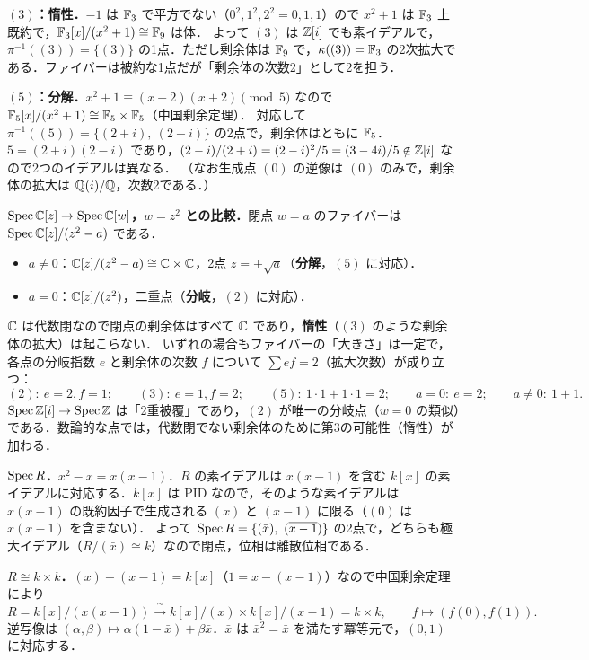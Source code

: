 \textbf{$(3)$：惰性．}$-1$ は $\mathbb{F}_3$ で平方でない（$0^2,1^2,2^2=0,1,1$）ので $x^2+1$ は $\mathbb{F}_3$ 上既約で，$\mathbb{F}_3[x]/(x^2+1)\cong\mathbb{F}_9$ は体．
よって $(3)$ は $\mathbb{Z}[i]$ でも素イデアルで，$\pi^{-1}((3))=\{(3)\}$ の1点．ただし剰余体は $\mathbb{F}_9$ で，$\kappa((3))=\mathbb{F}_3$ の2次拡大である．ファイバーは被約な1点だが「剰余体の次数2」として2を担う．

\textbf{$(5)$：分解．}$x^2+1\equiv(x-2)(x+2)\pmod 5$ なので $\mathbb{F}_5[x]/(x^2+1)\cong\mathbb{F}_5\times\mathbb{F}_5$（中国剰余定理）．
対応して $\pi^{-1}((5))=\{(2+i),\ (2-i)\}$ の2点で，剰余体はともに $\mathbb{F}_5$．$5=(2+i)(2-i)$ であり，$(2-i)/(2+i)=(2-i)^2/5=(3-4i)/5\notin\mathbb{Z}[i]$ なので2つのイデアルは異なる．
（なお生成点 $(0)$ の逆像は $(0)$ のみで，剰余体の拡大は $\mathbb{Q}(i)/\mathbb{Q}$，次数2である．）

\textbf{$\operatorname{Spec}\mathbb{C}[z]\to\operatorname{Spec}\mathbb{C}[w]$，$w=z^2$ との比較．}閉点 $w=a$ のファイバーは $\operatorname{Spec}\mathbb{C}[z]/(z^2-a)$ である．
\begin{itemize}
  \item $a\neq0$：$\mathbb{C}[z]/(z^2-a)\cong\mathbb{C}\times\mathbb{C}$，2点 $z=\pm\sqrt a$（\textbf{分解}，$(5)$ に対応）．
  \item $a=0$：$\mathbb{C}[z]/(z^2)$，二重点（\textbf{分岐}，$(2)$ に対応）．
\end{itemize}
$\mathbb{C}$ は代数閉なので閉点の剰余体はすべて $\mathbb{C}$ であり，\textbf{惰性}（$(3)$ のような剰余体の拡大）は起こらない．
いずれの場合もファイバーの「大きさ」は一定で，各点の分岐指数 $e$ と剰余体の次数 $f$ について $\sum ef=2$（拡大次数）が成り立つ：
\[
  (2):\ e=2,f=1;\qquad (3):\ e=1,f=2;\qquad (5):\ 1\cdot1+1\cdot1=2;\qquad a=0:\ e=2;\qquad a\neq0:\ 1+1.
\]
$\operatorname{Spec}\mathbb{Z}[i]\to\operatorname{Spec}\mathbb{Z}$ は「2重被覆」であり，$(2)$ が唯一の分岐点（$w=0$ の類似）である．数論的な点では，代数閉でない剰余体のために第3の可能性（惰性）が加わる．

\textbf{$\operatorname{Spec} R$．}$x^2-x=x(x-1)$．$R$ の素イデアルは $x(x-1)$ を含む $k[x]$ の素イデアルに対応する．$k[x]$ は PID なので，そのような素イデアルは $x(x-1)$ の既約因子で生成される $(x)$ と $(x-1)$ に限る（$(0)$ は $x(x-1)$ を含まない）．
よって $\Spec R=\{(\bar x),\ (\overline{x-1})\}$ の2点で，どちらも極大イデアル（$R/(\bar x)\cong k$）なので閉点，位相は離散位相である．

\textbf{$R\cong k\times k$．}$(x)+(x-1)=k[x]$（$1=x-(x-1)$）なので中国剰余定理により
\[
  R=k[x]/(x(x-1))\xrightarrow{\ \sim\ }k[x]/(x)\times k[x]/(x-1)=k\times k,\qquad f\mapsto(f(0),f(1)).
\]
逆写像は $(\alpha,\beta)\mapsto\alpha(1-\bar x)+\beta\bar x$．$\bar x$ は $\bar x^2=\bar x$ を満たす冪等元で，$(0,1)$ に対応する．


